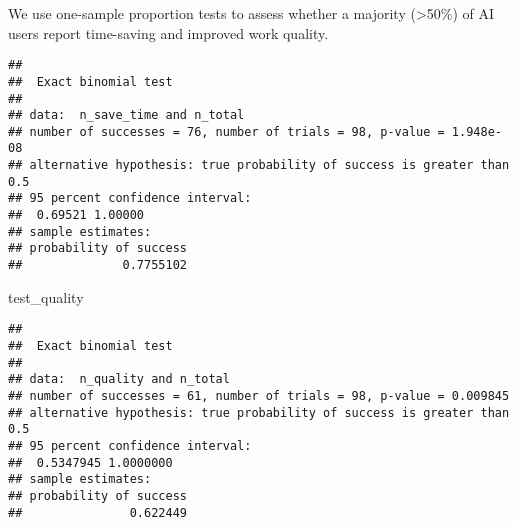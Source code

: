 \documentclass[
]{article}
\newenvironment{Shaded}{\begin{snugshade}}{\end{snugshade}}
\newcommand{\AttributeTok}[1]{\textcolor[rgb]{0.13,0.29,0.53}{#1}}
\newcommand{\CommentTok}[1]{\textcolor[rgb]{0.56,0.35,0.01}{\textit{#1}}}
\newcommand{\ConstantTok}[1]{\textcolor[rgb]{0.56,0.35,0.01}{#1}}
\newcommand{\FloatTok}[1]{\textcolor[rgb]{0.00,0.00,0.81}{#1}}
\newcommand{\FunctionTok}[1]{\textcolor[rgb]{0.13,0.29,0.53}{\textbf{#1}}}
\newcommand{\NormalTok}[1]{#1}
\newcommand{\OtherTok}[1]{\textcolor[rgb]{0.56,0.35,0.01}{#1}}
\newcommand{\SpecialCharTok}[1]{\textcolor[rgb]{0.81,0.36,0.00}{\textbf{#1}}}
\newcommand{\StringTok}[1]{\textcolor[rgb]{0.31,0.60,0.02}{#1}}
\begin{document}
We use one-sample proportion tests to assess whether a majority
(\textgreater50\%) of AI users report time-saving and improved work
quality.

\begin{Shaded}
\end{Shaded}

\begin{verbatim}
## 
##  Exact binomial test
## 
## data:  n_save_time and n_total
## number of successes = 76, number of trials = 98, p-value = 1.948e-08
## alternative hypothesis: true probability of success is greater than 0.5
## 95 percent confidence interval:
##  0.69521 1.00000
## sample estimates:
## probability of success 
##              0.7755102
\end{verbatim}

\begin{Shaded}
\begin{Highlighting}[]
\NormalTok{test\_quality}
\end{Highlighting}
\end{Shaded}

\begin{verbatim}
## 
##  Exact binomial test
## 
## data:  n_quality and n_total
## number of successes = 61, number of trials = 98, p-value = 0.009845
## alternative hypothesis: true probability of success is greater than 0.5
## 95 percent confidence interval:
##  0.5347945 1.0000000
## sample estimates:
## probability of success 
##               0.622449
\end{verbatim}
\end{document}
